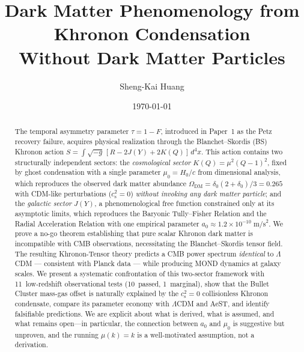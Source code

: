 \documentclass[prd,twocolumn,superscriptaddress,longbibliography,floatfix]{revtex4-2}
\newcommand{\tauasym}{\tau}
\newcommand{\cs}{c_{\mathrm{s}}}
\begin{document}
\title{Dark Matter Phenomenology from Khronon Condensation\\
Without Dark Matter Particles}

\author{Sheng-Kai Huang}

\date{\today}

\begin{abstract}
The temporal asymmetry parameter $\tauasym = 1 - F$, introduced in
Paper~1 as the Petz recovery failure, acquires physical realization
through the Blanchet--Skordis (BS) Khronon action
$S = \int\!\sqrt{-g}\,[R - 2J(Y) + 2K(Q)]\,d^4x$.
This action contains two structurally independent sectors: the
\emph{cosmological sector} $K(Q) = \mu^2(Q-1)^2$, fixed by ghost
condensation with a single parameter $\mu_0 = H_0/c$ from
dimensional analysis, which reproduces the observed dark matter
abundance $\Omega_{\mathrm{DM}} = \delta_0(2{+}\delta_0)/3 = 0.265$
with CDM-like perturbations ($\cs^2 = 0$) \emph{without invoking
any dark matter particle}; and the
\emph{galactic sector} $J(Y)$, a phenomenological free function
constrained only at its asymptotic limits, which reproduces the
Baryonic Tully--Fisher Relation and the Radial Acceleration Relation
with one empirical parameter $a_0 \approx 1.2 \times 10^{-10}\;\mathrm{m/s}^2$.
We prove a no-go theorem establishing that pure scalar Khronon dark
matter is incompatible with CMB observations, necessitating the
Blanchet--Skordis tensor field. The resulting Khronon-Tensor theory
predicts a CMB power spectrum \emph{identical} to $\Lambda$CDM ---
consistent with Planck data --- while producing MOND dynamics at
galaxy scales.
We present a systematic confrontation of this two-sector framework
with 11~low-redshift observational tests (10~passed, 1~marginal),
show that the Bullet Cluster mass-gas offset is naturally explained
by the $\cs^2 = 0$ collisionless Khronon condensate, compare its
parameter economy with $\Lambda$CDM and AeST, and identify
falsifiable predictions.
We are explicit about what is derived, what is assumed, and what
remains open---in particular, the connection between $a_0$ and
$\mu_0$ is suggestive but unproven, and the running
$\mu(k) = k$ is a well-motivated assumption, not a derivation.
\end{abstract}

\maketitle


\end{document}
